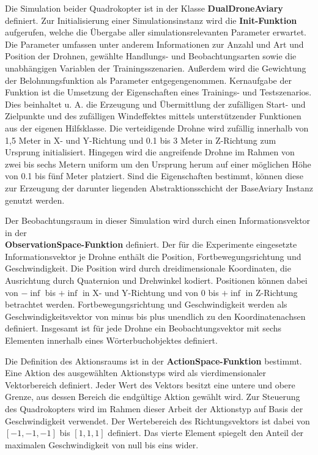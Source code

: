 Die Simulation beider Quadrokopter ist in der Klasse \textbf{DualDroneAviary} definiert.
Zur Initialisierung einer Simulationsinstanz wird die \textbf{Init-Funktion} aufgerufen, welche die Übergabe aller simulationsrelevanten Parameter erwartet.
Die Parameter umfassen unter anderem Informationen zur Anzahl und Art und Position der Drohnen, gewählte Handlungs- und Beobachtungsarten sowie die unabhängigen Variablen der Trainingsszenarien.
Außerdem wird die Gewichtung der Belohnungsfunktion als Parameter entgegengenommen.
Kernaufgabe der Funktion ist die Umsetzung der Eigenschaften eines Trainings- und Testszenarios.
Dies beinhaltet u. A. die Erzeugung und Übermittlung der zufälligen Start- und Zielpunkte und des zufälligen Windeffektes mittels unterstützender Funktionen aus der eigenen Hilfsklasse.
Die verteidigende Drohne wird zufällig innerhalb von 1,5 Meter in X- und Y-Richtung und 0.1 bis 3 Meter in Z-Richtung zum Ursprung initialisiert.
Hingegen wird die angreifende Drohne im Rahmen von zwei bis sechs Metern uniform um den Ursprung herum auf einer möglichen Höhe von 0.1 bis fünf Meter platziert.
Sind die Eigenschaften bestimmt, können diese zur Erzeugung der darunter liegenden Abstraktionsschicht der BaseAviary Instanz genutzt werden.

Der Beobachtungsraum in dieser Simulation wird durch einen Informationsvektor in der \\ \textbf{ObservationSpace-Funktion} definiert.
Der für die Experimente eingesetzte Informationsvektor je Drohne enthält die Position, Fortbewegungsrichtung und Geschwindigkeit.
Die Position wird durch dreidimensionale Koordinaten, die Ausrichtung durch Quaternion und Drehwinkel kodiert.
Positionen können dabei von $- \inf$ bis $+ \inf$ in X- und Y-Richtung und von $0$ bis $+ \inf$ in Z-Richtung betrachtet werden.
Fortbewegungsrichtung und Geschwindigkeit werden als Geschwindigkeitsvektor von minus bis plus unendlich zu den Koordinatenachsen definiert.
Insgesamt ist für jede Drohne ein Beobachtungsvektor mit sechs Elementen innerhalb eines Wörterbuchobjektes definiert.

Die Definition des Aktionsraums ist in der \textbf{ActionSpace-Funktion} bestimmt.
Eine Aktion des ausgewählten Aktionstyps wird als vierdimensionaler Vektorbereich definiert.
Jeder Wert des Vektors besitzt eine untere und obere Grenze, aus dessen Bereich die endgültige Aktion gewählt wird.
Zur Steuerung des Quadrokopters wird im Rahmen dieser Arbeit der Aktionstyp auf Basis der Geschwindigkeit verwendet.
Der Wertebereich des Richtungsvektors ist dabei von $[-1,-1,-1]$ bis $[1,1,1]$ definiert. 
Das vierte Element spiegelt den Anteil der maximalen Geschwindigkeit von null bis eins wider.


